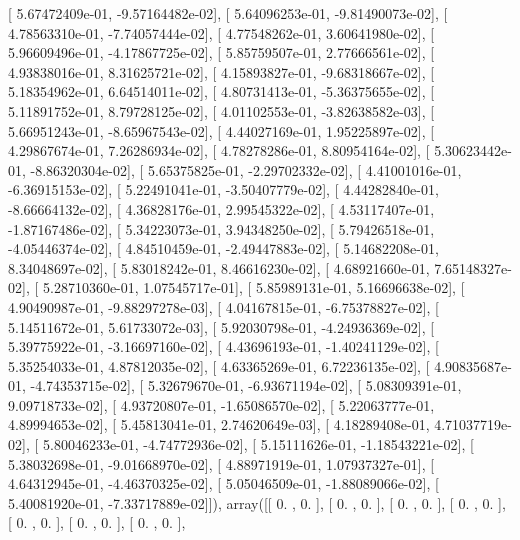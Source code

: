 \documentclass{article}
\begin{document}
       [  5.67472409e-01,  -9.57164482e-02],
       [  5.64096253e-01,  -9.81490073e-02],
       [  4.78563310e-01,  -7.74057444e-02],
       [  4.77548262e-01,   3.60641980e-02],
       [  5.96609496e-01,  -4.17867725e-02],
       [  5.85759507e-01,   2.77666561e-02],
       [  4.93838016e-01,   8.31625721e-02],
       [  4.15893827e-01,  -9.68318667e-02],
       [  5.18354962e-01,   6.64514011e-02],
       [  4.80731413e-01,  -5.36375655e-02],
       [  5.11891752e-01,   8.79728125e-02],
       [  4.01102553e-01,  -3.82638582e-03],
       [  5.66951243e-01,  -8.65967543e-02],
       [  4.44027169e-01,   1.95225897e-02],
       [  4.29867674e-01,   7.26286934e-02],
       [  4.78278286e-01,   8.80954164e-02],
       [  5.30623442e-01,  -8.86320304e-02],
       [  5.65375825e-01,  -2.29702332e-02],
       [  4.41001016e-01,  -6.36915153e-02],
       [  5.22491041e-01,  -3.50407779e-02],
       [  4.44282840e-01,  -8.66664132e-02],
       [  4.36828176e-01,   2.99545322e-02],
       [  4.53117407e-01,  -1.87167486e-02],
       [  5.34223073e-01,   3.94348250e-02],
       [  5.79426518e-01,  -4.05446374e-02],
       [  4.84510459e-01,  -2.49447883e-02],
       [  5.14682208e-01,   8.34048697e-02],
       [  5.83018242e-01,   8.46616230e-02],
       [  4.68921660e-01,   7.65148327e-02],
       [  5.28710360e-01,   1.07545717e-01],
       [  5.85989131e-01,   5.16696638e-02],
       [  4.90490987e-01,  -9.88297278e-03],
       [  4.04167815e-01,  -6.75378827e-02],
       [  5.14511672e-01,   5.61733072e-03],
       [  5.92030798e-01,  -4.24936369e-02],
       [  5.39775922e-01,  -3.16697160e-02],
       [  4.43696193e-01,  -1.40241129e-02],
       [  5.35254033e-01,   4.87812035e-02],
       [  4.63365269e-01,   6.72236135e-02],
       [  4.90835687e-01,  -4.74353715e-02],
       [  5.32679670e-01,  -6.93671194e-02],
       [  5.08309391e-01,   9.09718733e-02],
       [  4.93720807e-01,  -1.65086570e-02],
       [  5.22063777e-01,   4.89994653e-02],
       [  5.45813041e-01,   2.74620649e-03],
       [  4.18289408e-01,   4.71037719e-02],
       [  5.80046233e-01,  -4.74772936e-02],
       [  5.15111626e-01,  -1.18543221e-02],
       [  5.38032698e-01,  -9.01668970e-02],
       [  4.88971919e-01,   1.07937327e-01],
       [  4.64312945e-01,  -4.46370325e-02],
       [  5.05046509e-01,  -1.88089066e-02],
       [  5.40081920e-01,  -7.33717889e-02]]), array([[ 0.        ,  0.        ],
       [ 0.        ,  0.        ],
       [ 0.        ,  0.        ],
       [ 0.        ,  0.        ],
       [ 0.        ,  0.        ],
       [ 0.        ,  0.        ],
       [ 0.        ,  0.        ],
\end{document}
